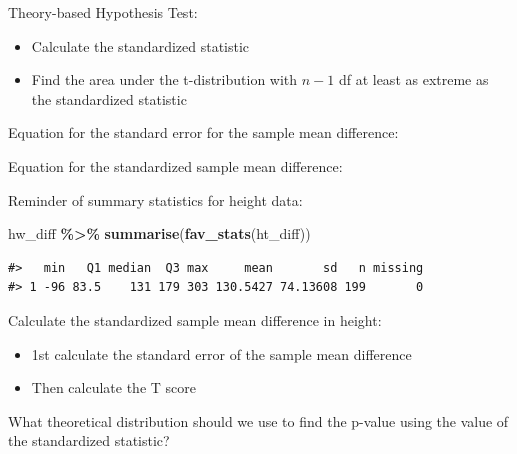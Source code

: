 \documentclass[
]{report}
\newenvironment{Shaded}{\begin{snugshade}}{\end{snugshade}}
\newcommand{\FunctionTok}[1]{\textcolor[rgb]{0.13,0.29,0.53}{\textbf{#1}}}
\newcommand{\NormalTok}[1]{#1}
\newcommand{\SpecialCharTok}[1]{\textcolor[rgb]{0.81,0.36,0.00}{\textbf{#1}}}
\providecommand{\tightlist}{%
  \setlength{\itemsep}{0pt}\setlength{\parskip}{0pt}}
\begin{document}
Theory-based Hypothesis Test:

\begin{itemize}
\item
  Calculate the standardized statistic
\item
  Find the area under the t-distribution with \(n - 1\) df at least as extreme as the standardized statistic
\end{itemize}

Equation for the standard error for the sample mean difference:

\vspace{0.5in}

Equation for the standardized sample mean difference:

\vspace{0.5in}

Reminder of summary statistics for height data:

\begin{Shaded}
\begin{Highlighting}[]
\NormalTok{hw\_diff }\SpecialCharTok{\%\textgreater{}\%}
    \FunctionTok{summarise}\NormalTok{(}\FunctionTok{fav\_stats}\NormalTok{(ht\_diff))}
\end{Highlighting}
\end{Shaded}

\begin{verbatim}
#>   min   Q1 median  Q3 max     mean       sd   n missing
#> 1 -96 83.5    131 179 303 130.5427 74.13608 199       0
\end{verbatim}

Calculate the standardized sample mean difference in height:

\begin{itemize}
\tightlist
\item
  1st calculate the standard error of the sample mean difference
\end{itemize}

\vspace{0.5in}

\begin{itemize}
\tightlist
\item
  Then calculate the T score
\end{itemize}

\vspace{0.5in}

What theoretical distribution should we use to find the p-value using the value of the standardized statistic?

\vspace{0.3in}
\end{document}
